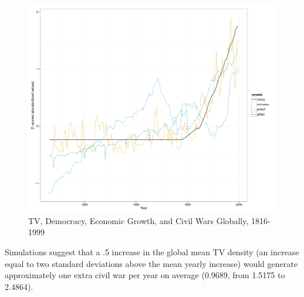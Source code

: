\documentclass[12pt,article,oneside]{memoir}
\makeatletter
\def\maxwidth{\ifdim\Gin@nat@width>\linewidth\linewidth
\else\Gin@nat@width\fi}
\let\Oldincludegraphics\includegraphics
\renewcommand{\includegraphics}[1]{\Oldincludegraphics[width=\maxwidth]{#1}}
\makeatother
\begin{document}
\begin{figure}[htbp]
\centering
\includegraphics{media_civil_war_files/figure-markdown/longrunplot.pdf}
\caption{TV, Democracy, Economic Growth, and Civil Wars Globally,
1816-1999}
\end{figure}

Simulations suggest that a .5 increase in the global mean TV density (an
increase equal to two standard deviations above the mean yearly
increase) would generate approximately one extra civil war per year on
average (0.9689, from 1.5175 to 2.4864).
\end{document}
